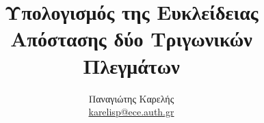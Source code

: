 \documentclass[a4paper,12pt]{report}
\def\tl{\textlatin}
\begin{document}


\title{Υπολογισμός της Ευκλείδειας Απόστασης δύο Τριγωνικών Πλεγμάτων}
\author{Παναγιώτης Καρελής \\
\href{mailto:karelisp@ece.auth.gr}{\tl{karelisp@ece.auth.gr}}}
\maketitle

\tableofcontents
\thispagestyle{empty}








\appendix



{}

\end{document}
